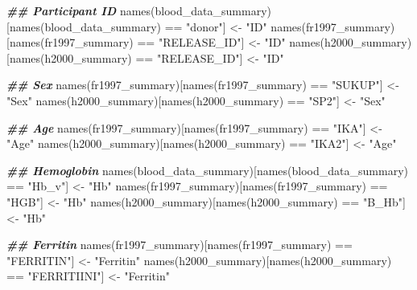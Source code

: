 \documentclass[
]{article}
\newenvironment{Shaded}{\begin{snugshade}}{\end{snugshade}}
\newcommand{\DocumentationTok}[1]{\textcolor[rgb]{0.56,0.35,0.01}{\textbf{\textit{#1}}}}
\newcommand{\FunctionTok}[1]{\textcolor[rgb]{0.00,0.00,0.00}{#1}}
\newcommand{\NormalTok}[1]{#1}
\newcommand{\OtherTok}[1]{\textcolor[rgb]{0.56,0.35,0.01}{#1}}
\newcommand{\SpecialCharTok}[1]{\textcolor[rgb]{0.00,0.00,0.00}{#1}}
\newcommand{\StringTok}[1]{\textcolor[rgb]{0.31,0.60,0.02}{#1}}
\begin{document}
\begin{Shaded}
\begin{Highlighting}[]
\DocumentationTok{\#\# Participant ID }
\FunctionTok{names}\NormalTok{(blood\_data\_summary)[}\FunctionTok{names}\NormalTok{(blood\_data\_summary) }\SpecialCharTok{==} \StringTok{"donor"}\NormalTok{] }\OtherTok{\textless{}{-}} \StringTok{"ID"}
\FunctionTok{names}\NormalTok{(fr1997\_summary)[}\FunctionTok{names}\NormalTok{(fr1997\_summary) }\SpecialCharTok{==} \StringTok{"RELEASE\_ID"}\NormalTok{] }\OtherTok{\textless{}{-}} \StringTok{"ID"}
\FunctionTok{names}\NormalTok{(h2000\_summary)[}\FunctionTok{names}\NormalTok{(h2000\_summary) }\SpecialCharTok{==} \StringTok{"RELEASE\_ID"}\NormalTok{] }\OtherTok{\textless{}{-}} \StringTok{"ID"}

\DocumentationTok{\#\# Sex}
\FunctionTok{names}\NormalTok{(fr1997\_summary)[}\FunctionTok{names}\NormalTok{(fr1997\_summary) }\SpecialCharTok{==} \StringTok{"SUKUP"}\NormalTok{] }\OtherTok{\textless{}{-}} \StringTok{"Sex"}
\FunctionTok{names}\NormalTok{(h2000\_summary)[}\FunctionTok{names}\NormalTok{(h2000\_summary) }\SpecialCharTok{==} \StringTok{"SP2"}\NormalTok{] }\OtherTok{\textless{}{-}} \StringTok{"Sex"}

\DocumentationTok{\#\# Age}
\FunctionTok{names}\NormalTok{(fr1997\_summary)[}\FunctionTok{names}\NormalTok{(fr1997\_summary) }\SpecialCharTok{==} \StringTok{"IKA"}\NormalTok{] }\OtherTok{\textless{}{-}} \StringTok{"Age"}
\FunctionTok{names}\NormalTok{(h2000\_summary)[}\FunctionTok{names}\NormalTok{(h2000\_summary) }\SpecialCharTok{==} \StringTok{"IKA2"}\NormalTok{] }\OtherTok{\textless{}{-}} \StringTok{"Age"}

\DocumentationTok{\#\# Hemoglobin}
\FunctionTok{names}\NormalTok{(blood\_data\_summary)[}\FunctionTok{names}\NormalTok{(blood\_data\_summary) }\SpecialCharTok{==} \StringTok{"Hb\_v"}\NormalTok{] }\OtherTok{\textless{}{-}} \StringTok{"Hb"}
\FunctionTok{names}\NormalTok{(fr1997\_summary)[}\FunctionTok{names}\NormalTok{(fr1997\_summary) }\SpecialCharTok{==} \StringTok{"HGB"}\NormalTok{] }\OtherTok{\textless{}{-}} \StringTok{"Hb"}
\FunctionTok{names}\NormalTok{(h2000\_summary)[}\FunctionTok{names}\NormalTok{(h2000\_summary) }\SpecialCharTok{==} \StringTok{"B\_Hb"}\NormalTok{] }\OtherTok{\textless{}{-}} \StringTok{"Hb"}

\DocumentationTok{\#\# Ferritin}
\FunctionTok{names}\NormalTok{(fr1997\_summary)[}\FunctionTok{names}\NormalTok{(fr1997\_summary) }\SpecialCharTok{==} \StringTok{"FERRITIN"}\NormalTok{] }\OtherTok{\textless{}{-}} \StringTok{"Ferritin"}
\FunctionTok{names}\NormalTok{(h2000\_summary)[}\FunctionTok{names}\NormalTok{(h2000\_summary) }\SpecialCharTok{==} \StringTok{"FERRITIINI"}\NormalTok{] }\OtherTok{\textless{}{-}} \StringTok{"Ferritin"}


\end{Highlighting}
\end{Shaded}
\end{document}
